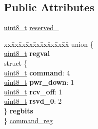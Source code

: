 \subsection*{Public Attributes}
\begin{DoxyCompactItemize}
\item 
\hyperlink{vl53l0x__types_8h_aba7bc1797add20fe3efdf37ced1182c5}{uint8\+\_\+t} \hyperlink{structstruct_a98137858bbe84718f27b15f7f524ee23}{reserved\+\_}
\item 
\begin{tabbing}
xx\=xx\=xx\=xx\=xx\=xx\=xx\=xx\=xx\=\kill
union \{\\
\>\hyperlink{vl53l0x__types_8h_aba7bc1797add20fe3efdf37ced1182c5}{uint8\_t} {\bfseries regval}\\
\>struct \{\\
\>\>\hyperlink{vl53l0x__types_8h_aba7bc1797add20fe3efdf37ced1182c5}{uint8\_t} {\bfseries command}: 4\\
\>\>\hyperlink{vl53l0x__types_8h_aba7bc1797add20fe3efdf37ced1182c5}{uint8\_t} {\bfseries pwr\_down}: 1\\
\>\>\hyperlink{vl53l0x__types_8h_aba7bc1797add20fe3efdf37ced1182c5}{uint8\_t} {\bfseries rcv\_off}: 1\\
\>\>\hyperlink{vl53l0x__types_8h_aba7bc1797add20fe3efdf37ced1182c5}{uint8\_t} {\bfseries rsvd\_0}: 2\\
\>\} {\bfseries regbits}\\
\} \hyperlink{structstruct_a4ad4bf4bdf213b87b9b52e993c0a7793}{command\_reg}\\


\end{tabbing}
\end{DoxyCompactItemize}
